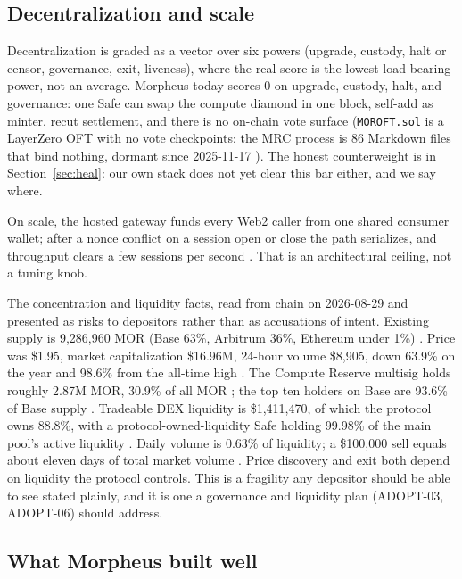 \documentclass[11pt,a4paper]{article}
\newcommand{\code}[1]{\texttt{\small #1}}
\newcommand{\prov}[1]{{\color{muted}\footnotesize\sffamily[#1]}}
\begin{document}
\subsection{Decentralization and scale}

Decentralization is graded as a vector over six powers (upgrade, custody, halt or censor,
governance, exit, liveness), where the real score is the lowest load-bearing power, not an
average. Morpheus today scores 0 on upgrade, custody, halt, and governance: one Safe can swap
the compute diamond in one block, self-add as minter, recut settlement, and there is no
on-chain vote surface (\code{MOROFT.sol} is a LayerZero OFT with no vote checkpoints; the MRC
process is 86 Markdown files that bind nothing, dormant since 2025-11-17 \prov{verified}). The
honest counterweight is in Section~\ref{sec:heal}: our own stack does not yet clear this bar
either, and we say where.

On scale, the hosted gateway funds every Web2 caller from one shared consumer wallet; after a
nonce conflict on a session open or close the path serializes, and throughput clears a few
sessions per second \prov{verified}. That is an architectural ceiling, not a tuning knob.

The concentration and liquidity facts, read from chain on 2026-08-29 and presented as risks to
depositors rather than as accusations of intent. Existing supply is 9,286,960 MOR (Base 63\%,
Arbitrum 36\%, Ethereum under 1\%) \prov{verified}. Price was \$1.95, market capitalization
\$16.96M, 24-hour volume \$8,905, down 63.9\% on the year and 98.6\% from the all-time high
\prov{verified}. The Compute Reserve multisig holds roughly 2.87M MOR, 30.9\% of all MOR
\prov{verified}; the top ten holders on Base are 93.6\% of Base supply \prov{verified}. Tradeable
DEX liquidity is \$1,411,470, of which the protocol owns 88.8\%, with a protocol-owned-liquidity
Safe holding 99.98\% of the main pool's active liquidity \prov{verified}. Daily volume is 0.63\%
of liquidity; a \$100,000 sell equals about eleven days of total market volume \prov{derived}.
Price discovery and exit both depend on liquidity the protocol controls. This is a fragility any
depositor should be able to see stated plainly, and it is one a governance and liquidity plan
(ADOPT-03, ADOPT-06) should address.

\subsection{What Morpheus built well}
\end{document}
